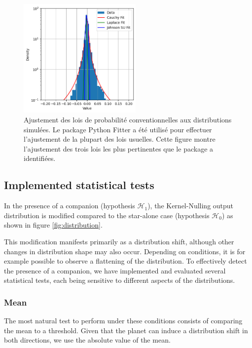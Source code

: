 \documentclass{article}
\begin{document}
\begin{figure}[H]
\centering
\includegraphics[width=6cm]{img/fits.png}
\caption{Ajustement des lois de probabilité conventionnelles aux distributions simulées. Le package Python Fitter a été utilisé pour effectuer l'ajustement de la plupart des lois usuelles. Cette figure montre l'ajustement des trois lois les plus pertinentes que le package a identifiées.}
\label{fig:fits}
\end{figure}



\subsection{Implemented statistical tests}

In the presence of a companion (hypothesis $\mathcal{H}_1$), the Kernel-Nulling output distribution is modified compared to the star-alone case (hypothesis $\mathcal{H}_0$) as shown in figure \ref{fig:distribution}.

This modification manifests primarily as a distribution shift, although other changes in distribution shape may also occur. Depending on conditions, it is for example possible to observe a flattening of the distribution. To effectively detect the presence of a companion, we have implemented and evaluated several statistical tests, each being sensitive to different aspects of the distributions.

\subsubsection{Mean}

The most natural test to perform under these conditions consists of comparing the mean to a threshold. Given that the planet can induce a distribution shift in both directions, we use the absolute value of the mean.
\end{document}

